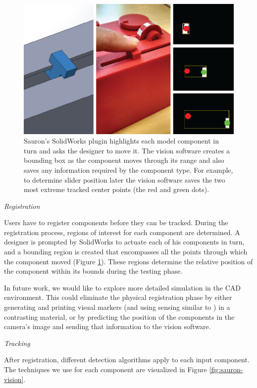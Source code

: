 \begin{figure}
\centering
\includegraphics[width=\textwidth]{figures/sauron/vision-slider.png}
\caption{Sauron's SolidWorks plugin highlights each model component in turn and asks the designer to move it. The vision software creates a bounding box as the component moves through its range and also saves any information required by the component type. For example, to determine slider position later the vision software saves the two most extreme tracked center points (the red and green dots).}
\label{fig:sauron-vision-process}
\end{figure}

\emph{Registration}

Users have to register components before they can be tracked. During the registration process, regions of interest for each component are determined. A designer is prompted by SolidWorks to actuate each of his components in turn, and a bounding region is created that encompasses all the points through which the component moved (Figure \ref{fig:sauron-vision-process}). These regions determine the relative position of the component within its bounds during the testing phase.

In future work, we would like to explore more detailed simulation in the CAD environment. This could eliminate the physical registration phase by either generating and printing visual markers (and using sensing similar to \cite{doering-composition}) in a contrasting material, or by predicting the position of the components in the camera's image and sending that information to the vision software.

\emph{Tracking}

After registration, different detection algorithms apply to each input component. The techniques we use for each component are visualized in Figure \ref{fig:sauron-vision}.

